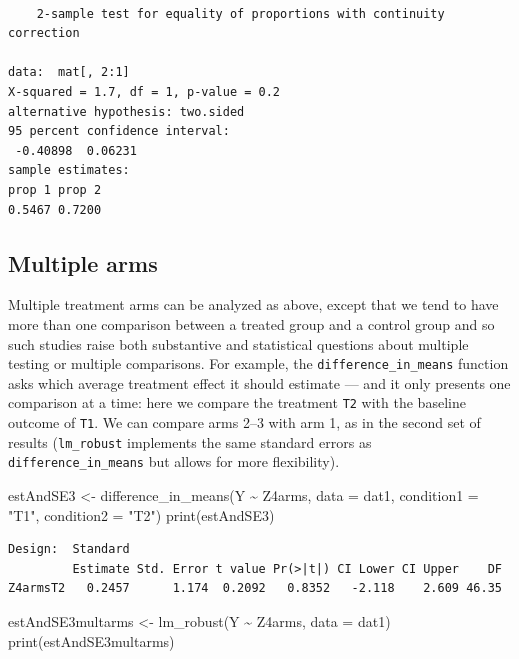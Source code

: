 \documentclass[
  12pt,
]{book}
\newenvironment{Shaded}{\begin{snugshade}}{\end{snugshade}}
\newcommand{\AttributeTok}[1]{\textcolor[rgb]{0.77,0.63,0.00}{#1}}
\newcommand{\FunctionTok}[1]{\textcolor[rgb]{0.00,0.00,0.00}{#1}}
\newcommand{\NormalTok}[1]{#1}
\newcommand{\OtherTok}[1]{\textcolor[rgb]{0.56,0.35,0.01}{#1}}
\newcommand{\SpecialCharTok}[1]{\textcolor[rgb]{0.00,0.00,0.00}{#1}}
\newcommand{\StringTok}[1]{\textcolor[rgb]{0.31,0.60,0.02}{#1}}
\theoremstyle{definition}
\theoremstyle{definition}
\theoremstyle{definition}
\theoremstyle{remark}
\begin{document}
\begin{verbatim}

    2-sample test for equality of proportions with continuity correction

data:  mat[, 2:1]
X-squared = 1.7, df = 1, p-value = 0.2
alternative hypothesis: two.sided
95 percent confidence interval:
 -0.40898  0.06231
sample estimates:
prop 1 prop 2 
0.5467 0.7200 
\end{verbatim}

\hypertarget{multiple-arms}{%
\subsection{Multiple arms}\label{multiple-arms}}

Multiple treatment arms can be analyzed as above, except that we tend to
have more than one comparison between a treated group and a control
group and so such studies raise both substantive and statistical
questions about multiple testing or multiple comparisons. For example,
the \texttt{difference\_in\_means} function asks which average treatment
effect it should estimate --- and it only presents one comparison at a
time: here we compare the treatment \texttt{T2} with the baseline
outcome of \texttt{T1}. We can compare arms 2--3 with arm 1, as in the
second set of results (\texttt{lm\_robust} implements the same standard
errors as \texttt{difference\_in\_means} but allows for more
flexibility).

\begin{Shaded}
\begin{Highlighting}[]
\NormalTok{estAndSE3 }\OtherTok{\textless{}{-}} \FunctionTok{difference\_in\_means}\NormalTok{(Y }\SpecialCharTok{\textasciitilde{}}\NormalTok{ Z4arms, }\AttributeTok{data =}\NormalTok{ dat1, }\AttributeTok{condition1 =} \StringTok{"T1"}\NormalTok{, }\AttributeTok{condition2 =} \StringTok{"T2"}\NormalTok{)}
\FunctionTok{print}\NormalTok{(estAndSE3)}
\end{Highlighting}
\end{Shaded}

\begin{verbatim}
Design:  Standard 
         Estimate Std. Error t value Pr(>|t|) CI Lower CI Upper    DF
Z4armsT2   0.2457      1.174  0.2092   0.8352   -2.118    2.609 46.35
\end{verbatim}

\begin{Shaded}
\begin{Highlighting}[]
\NormalTok{estAndSE3multarms }\OtherTok{\textless{}{-}} \FunctionTok{lm\_robust}\NormalTok{(Y }\SpecialCharTok{\textasciitilde{}}\NormalTok{ Z4arms, }\AttributeTok{data =}\NormalTok{ dat1)}
\FunctionTok{print}\NormalTok{(estAndSE3multarms)}
\end{Highlighting}
\end{Shaded}
\end{document}
